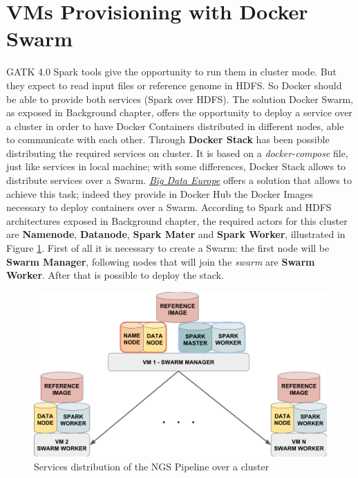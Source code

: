 \section{VMs Provisioning with Docker Swarm}
GATK 4.0 Spark tools give the opportunity to run them in cluster mode. But they expect to read input files or reference genome in HDFS. So Docker should be able to provide both services (Spark over HDFS). The solution Docker Swarm, as exposed in Background chapter, offers the opportunity to deploy a service over a cluster in order to have Docker Containers distributed in different nodes, able to communicate with each other. Through \textbf{Docker Stack} has been possible distributing the required services on cluster. It is based on a \textit{docker-compose} file, just like services in local machine; with some differences, Docker Stack allows to distribute services over a Swarm.\newline
\textit{\href{https://www.big-data-europe.eu/}{Big Data Europe}} offers a solution that allows to achieve this task; indeed they provide in Docker Hub the Docker Images necessary to deploy containers over a Swarm.\newline
According to Spark and HDFS architectures exposed in Background chapter, the required actors for this cluster are \textbf{Namenode}, \textbf{Datanode}, \textbf{Spark Mater} and \textbf{Spark Worker}, illustrated in Figure \ref{NGS_services_swarm}. First of all it is necessary to create a Swarm: the first node will be \textbf{Swarm Manager}, following nodes that will join the \textit{swarm} are \textbf{Swarm Worker}. After that is possible to deploy the stack.
\begin{figure}[h] 
\begin{center}
\includegraphics[scale=0.45]{figure/stack_spark_hdfs.png}
\end{center}
\caption{Services distribution of the NGS Pipeline over a cluster ~\label{NGS_services_swarm}}
\end{figure}
